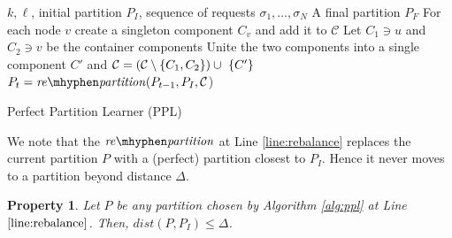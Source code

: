 \documentclass[manuscript,screen=true]{acmart}
\newtheorem{property}{Property}
\DeclarePairedDelimiter\set{\{}{\}}
\newcommand\maciek[1]{\color{brown}\textbf{\\ Maciek: #1}\color{black}}
\begin{document}
\begin{algorithm}
    \renewcommand{\algorithmicrequire}{\textbf{Input:}}
    \renewcommand{\algorithmicensure}{\textbf{Output:}}
    \begin{algorithmic}[1]
        \Require 
        $k, \ell$,
        initial partition $P_I$,
        sequence of  requests $\sigma_1, \dots, \sigma_N$ 
        \Ensure A final partition $P_F$ 
        \State For each node $v$ create a singleton component $C_v$ and add it to $\mathcal{C}$
         \label{line:initcomponents}
        \State Let $C_1 \ni u$ and $C_2 \ni v$ be the container components
        \State Unite the two components into a single component $C'$ and
        $\mathcal{C} = (\mathcal{C}\setminus\set{C_1, C_2}) \cup ~\set{C'}$ \label{line:mergecomponents}
        \State $P_{t} = \mathit{re\mhyphen partition}(P_{t-1}, P_I, \mathcal{C}$) \label{line:rebalance} 
        \EndIf
        \EndIf
        \EndFor
    \end{algorithmic}
    \caption{Perfect Partition Learner (PPL)}
    \label{alg:ppl}
      \end{algorithm}
  
      We note that the $\mathit{re\mhyphen partition}$ at Line \ref{line:rebalance} replaces the current partition $P$ with a (perfect) partition closest to $P_I$.
Hence it never moves to a partition beyond distance $\Delta$.      
\begin{property} \label{prop:dist<OPT}
    Let $P$ be any partition chosen by Algorithm \ref{alg:ppl} at Line $\ref{line:rebalance}$.
    Then, $\mathit{dist}(P,P_I) \leq \Delta$.
\end{property}
\end{document}
